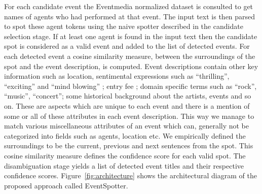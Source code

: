 \documentclass[10pt,a4paper]{article}
\begin{document}
For each candidate event the Eventmedia normalized dataset  is consulted to get names of agents who had performed at that event. The input text is then parsed to spot these agent tokens using the naive spotter described in the candidate selection stage. If at least one agent is found in the input text then the candidate spot is considered as a valid event and added to the list of detected events. For each detected event a cosine similarity measure,  between the surroundings of the spot and the event description, is computed. Event descriptions contain other key information such as location, sentimental expressions such as ``thrilling'', ``exciting'' and ``mind blowing'' ; entry fee ; domain specific terms such as ``rock'', ``music'', ``concert''; some historical background about the artists, events and so on. These are aspects which are unique to each event and there is a mention of some or all of these attributes in each event description. This way we manage to match various miscellaneous attributes of an event which can, generally not be categorized into fields such as agents, location etc. We empirically defined the surroundings to be the current, previous and next sentences from the spot. This cosine similarity measure defines the confidence score for each valid spot. The disambiguation stage yields a list of detected event titles and their respective confidence scores.
Figure~\ref{fig:architecture} shows the architectural diagram of the proposed approach called EventSpotter. 
\end{document}
